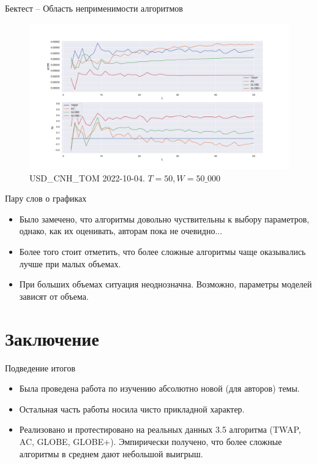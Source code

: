 \documentclass[aspectratio=169]{beamer}
\begin{document}
        \begin{frame}{Бектест -- Область неприменимости алгоритмов}

            \begin{figure}  
                \centering
                \includegraphics[width=0.83\linewidth]{USD_CNH_T+1 2022-10-04 T = 50 W = 500 x1000}
                \caption{USD\_CNH\_TOM 2022-10-04. $T = 50, W = 50\_000$}
            \end{figure}
            
        \end{frame}


        \begin{frame}{Пару слов о графиках}
            \begin{itemize}
                \item Было замечено, что алгоритмы довольно чуствительны к выбору параметров, однако, как их оценивать, авторам пока не очевидно...

                \item Более того стоит отметить, что более сложные алгоритмы чаще оказывались лучше при малых объемах. 
    
                \item При больших объемах ситуация неоднозначна. Возможно, параметры моделей зависят от объема. 
            \end{itemize}
        \end{frame}

    \section{Заключение}

        \begin{frame}{Подведение итогов}
            \begin{itemize}
                \item Была проведена работа по изучению абсолютно новой (для авторов) темы. 
                \item Остальная часть работы носила чисто прикладной характер.
                \item Реализовано и протестировано на реальных данных 3.5 алгоритма (TWAP, AC, GLOBE, GLOBE+). Эмпирически получено, что более сложные алгоритмы в среднем дают небольшой выигрыш.             
            \end{itemize}
        \end{frame}
\end{document}
